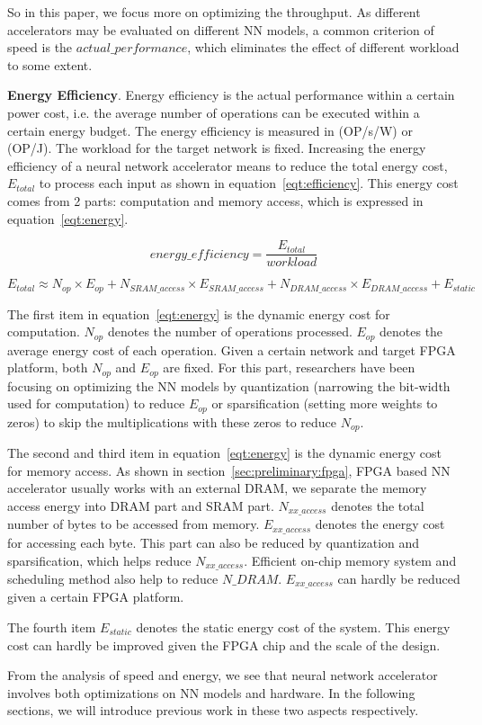 So in this paper, we focus more on optimizing the throughput. As different accelerators may be evaluated on different NN models, a common criterion of speed is the $actual\_performance$, which eliminates the effect of different workload to some extent.

\textbf{Energy Efficiency}. Energy efficiency is the actual performance within a certain power cost, i.e. the average number of operations can be executed within a certain energy budget. The energy efficiency is measured in (OP/s/W) or (OP/J). The workload for the target network is fixed. Increasing the energy efficiency of a neural network accelerator means to reduce the total energy cost, $E_{total}$ to process each input as shown in equation~\ref{eqt:efficiency}. This energy cost comes from 2 parts: computation and memory access, which is expressed in equation~\ref{eqt:energy}. 

\begin{equation}\label{eqt:efficiency}
    energy\_efficiency = \frac{E_{total}}{workload}
\end{equation}
    
\begin{equation}\label{eqt:energy}
    E_{total} \approx N_{op}\times E_{op} + N_{SRAM\_access}\times E_{SRAM\_access} + N_{DRAM\_access}\times E_{DRAM\_access} + E_{static}
\end{equation}


The first item in equation~\ref{eqt:energy} is the dynamic energy cost for computation. $N_{op}$ denotes the number of operations processed. $E_{op}$ denotes the average energy cost of each operation. Given a certain network and target FPGA platform, both $N_{op}$ and $E_{op}$ are fixed. For this part, researchers have been focusing on optimizing the NN models by quantization (narrowing the bit-width used for computation) to reduce $E_{op}$ or sparsification (setting more weights to zeros) to skip the multiplications with these zeros to reduce $N_{op}$.

The second and third item in equation~\ref{eqt:energy} is the dynamic energy cost for memory access. As shown in section~\ref{sec:preliminary:fpga}, FPGA based NN accelerator usually works with an external DRAM, we separate the memory access energy into DRAM part and SRAM part. $N_{xx\_access}$ denotes the total number of bytes to be accessed from memory. $E_{xx\_access}$ denotes the energy cost for accessing each byte. This part can also be reduced by quantization and sparsification, which helps reduce $N_{xx\_access}$. Efficient on-chip memory system and scheduling method also help to reduce $N\_{DRAM}$. $E_{xx\_access}$ can hardly be reduced given a certain FPGA platform.

The fourth item $E_{static}$ denotes the static energy cost of the system. This energy cost can hardly be improved given the FPGA chip and the scale of the design.

From the analysis of speed and energy, we see that neural network accelerator involves both optimizations on NN models and hardware. In the following sections, we will introduce previous work in these two aspects respectively.
